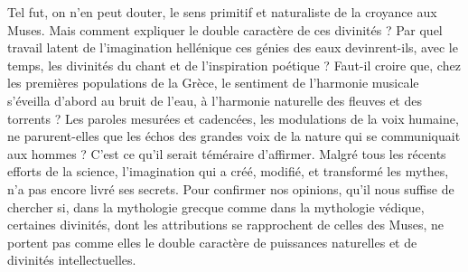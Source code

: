 \documentclass[a4paper, 11pt, oneside, polutonikogreek, french]{article}
\begin{document}
Tel fut, on n'en peut douter, le sens primitif et naturaliste de la croyance aux Muses. Mais comment expliquer le double caractère de ces divinités ? Par quel travail latent de l'imagination hellénique ces génies des eaux devinrent-ils, avec le temps, les divinités du chant et de l'inspiration poétique ? Faut-il croire que, chez les premières populations de la Grèce, le sentiment de l'harmonie musicale s'éveilla d'abord au bruit de l'eau, à l'harmonie naturelle des fleuves et des torrents ? Les paroles mesurées et cadencées, les modulations de la voix humaine, ne parurent-elles que les échos des grandes voix de la nature qui se communiquait aux hommes ? C'est ce qu'il serait téméraire d'affirmer. Malgré tous les récents efforts de la science, l'imagination qui a créé, modifié, et transformé les mythes, n'a pas encore livré ses secrets. Pour confirmer nos opinions, qu'il nous suffise de chercher si, dans la mythologie grecque comme dans la mythologie védique, certaines divinités, dont les attributions se rapprochent de celles des Muses, ne portent pas comme elles le double caractère de puissances naturelles et de divinités intellectuelles.
\end{document}
